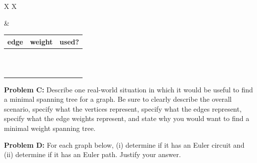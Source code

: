 \documentclass[11pt, oneside]{article}   	%
\begin{document}
\begin{tabularx}{\textwidth}{X X}

& 
\vspace{0pt}
\begin{tabular}{c|c|c}
edge & weight & used? \\
\hline
 &  & \\
 &  & \\
 &  & \\
 &  & \\
 &  & \\
 &  & \\
 &  & \\
 &  & \\
 &  & \\
 &  & \\
 &  & \\
\end{tabular}
\end{tabularx}

\hrulefill

\textbf{Problem C:} Describe one real-world situation in which it would be useful to find
a minimal spanning tree for a graph. Be sure to clearly describe the
overall scenario, specify what the vertices represent, specify what
the edges represent, specify what the edge weights represent, and
state why you would want to find a minimal weight spanning tree.


\hrulefill

\textbf{Problem D:} For each graph below, (i) determine if it has an Euler circuit and (ii) determine if it has an Euler path. Justify your answer. \\
\end{document}
